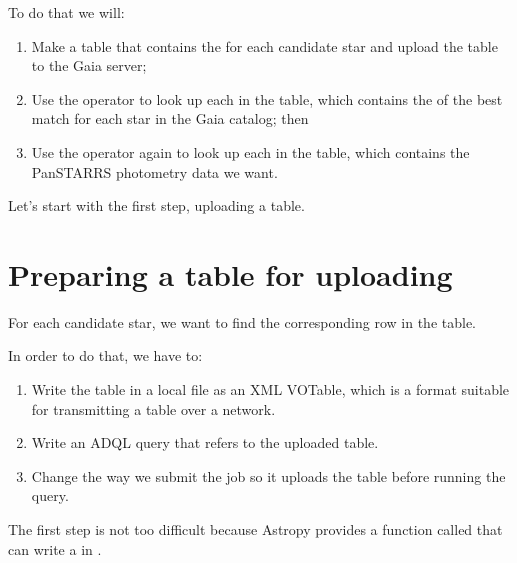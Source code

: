 \documentclass[letterpaper,10pt,english]{sphinxmanual}
\begin{document}
To do that we will:
\begin{enumerate}
%
\item {} 
Make a table that contains the  for each candidate star and upload the table to the Gaia server;

\item {} 
Use the  operator to look up each  in the  table, which contains the  of the best match for each star in the Gaia catalog; then

\item {} 
Use the  operator again to look up each  in the  table, which contains the Pan\sphinxhyphen{}STARRS photometry data we want.

\end{enumerate}

Let’s start with the first step, uploading a table.


\section{Preparing a table for uploading}
\label{\detokenize{05_join:preparing-a-table-for-uploading}}
For each candidate star, we want to find the corresponding row in the  table.

In order to do that, we have to:
\begin{enumerate}
%
\item {} 
Write the table in a local file as an XML VOTable, which is a format suitable for transmitting a table over a network.

\item {} 
Write an ADQL query that refers to the uploaded table.

\item {} 
Change the way we submit the job so it uploads the table before running the query.

\end{enumerate}

The first step is not too difficult because Astropy provides a function called  that can write a  in .
\end{document}
